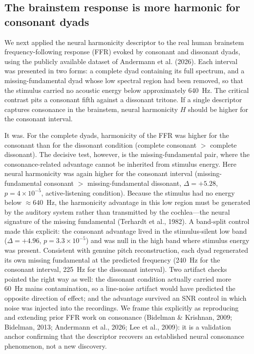 \documentclass[11pt]{article}
\begin{document}
\subsection{The brainstem response is more harmonic for consonant dyads}
We next applied the neural harmonicity descriptor to the real human brainstem frequency-following response (FFR) evoked by consonant and dissonant dyads, using the publicly available dataset of Andermann et al. (2026). Each interval was presented in two forms: a complete dyad containing its full spectrum, and a missing-fundamental dyad whose low spectral region had been removed, so that the stimulus carried no acoustic energy below approximately 640~Hz. The critical contrast pits a consonant fifth against a dissonant tritone. If a single descriptor captures consonance in the brainstem, neural harmonicity $H$ should be higher for the consonant interval.

It was. For the complete dyads, harmonicity of the FFR was higher for the consonant than for the dissonant condition (complete consonant $>$ complete dissonant). The decisive test, however, is the missing-fundamental pair, where the consonance-related advantage cannot be inherited from stimulus energy. Here neural harmonicity was again higher for the consonant interval (missing-fundamental consonant $>$ missing-fundamental dissonant, $\Delta=+5.28$, $p=4\times10^{-5}$, active-listening condition). Because the stimulus had no energy below $\approx 640$~Hz, the harmonicity advantage in this low region must be generated by the auditory system rather than transmitted by the cochlea---the neural signature of the missing fundamental (Terhardt et al., 1982). A band-split control made this explicit: the consonant advantage lived in the stimulus-silent low band ($\Delta=+4.96$, $p=3.3\times10^{-5}$) and was null in the high band where stimulus energy was present. Consistent with genuine pitch reconstruction, each dyad regenerated its own missing fundamental at the predicted frequency (240~Hz for the consonant interval, 225~Hz for the dissonant interval). Two artifact checks pointed the right way as well: the dissonant condition actually carried more 60~Hz mains contamination, so a line-noise artifact would have predicted the opposite direction of effect; and the advantage survived an SNR control in which noise was injected into the recordings. We frame this explicitly as reproducing and extending prior FFR work on consonance (Bidelman \& Krishnan, 2009; Bidelman, 2013; Andermann et al., 2026; Lee et al., 2009): it is a validation anchor confirming that the descriptor recovers an established neural consonance phenomenon, not a new discovery.
\end{document}

